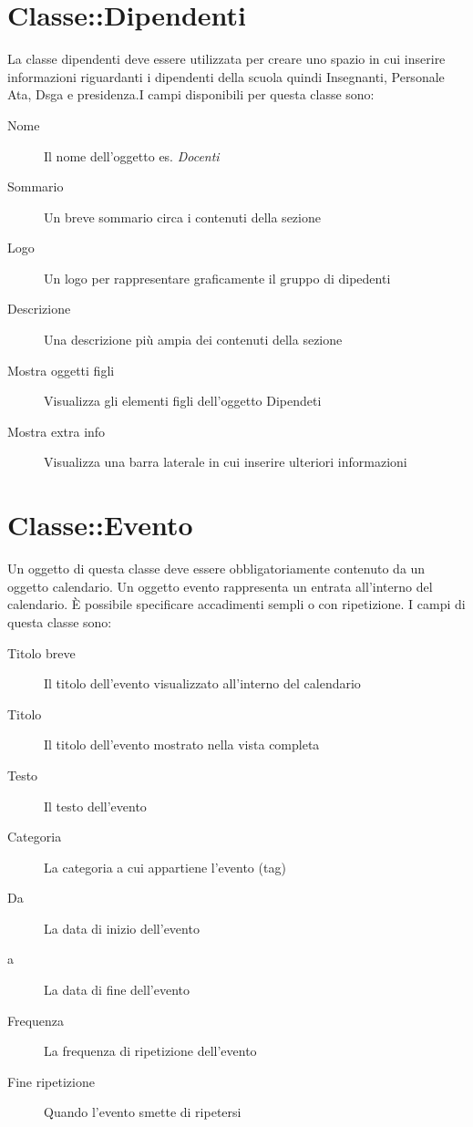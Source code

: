 \section{Classe::Dipendenti}
La classe dipendenti deve essere utilizzata per creare uno spazio in cui inserire informazioni riguardanti i dipendenti della scuola quindi Insegnanti, Personale Ata, Dsga e presidenza.I campi disponibili per questa classe sono:
\begin{description}
 \item[Nome] Il nome dell'oggetto es. \textsl{Docenti}
\item[Sommario]Un breve sommario circa i contenuti della sezione
\item[Logo]Un logo per rappresentare graficamente il gruppo di dipedenti
\item[Descrizione]Una descrizione più ampia dei contenuti della sezione
\item[Mostra oggetti figli]Visualizza gli elementi figli dell'oggetto Dipendeti
\item[Mostra extra info]Visualizza una barra laterale in cui inserire ulteriori informazioni
\end{description}


\section{Classe::Evento}
Un oggetto di questa classe deve essere obbligatoriamente contenuto da un oggetto calendario. Un oggetto evento rappresenta un entrata all'interno del calendario. È possibile specificare accadimenti sempli o con ripetizione.
I campi di questa classe sono:
\begin{description}
 \item[Titolo breve] Il titolo dell'evento visualizzato all'interno del calendario
\item[Titolo]Il titolo dell'evento mostrato nella vista completa
\item[Testo]Il testo dell'evento
\item[Categoria] La categoria a cui appartiene l'evento (tag)
\item[Da]La data di inizio dell'evento
\item[a]La data di fine dell'evento
\item[Frequenza]La frequenza di ripetizione dell'evento
\item[Fine ripetizione]Quando l'evento smette di ripetersi
\end{description}

